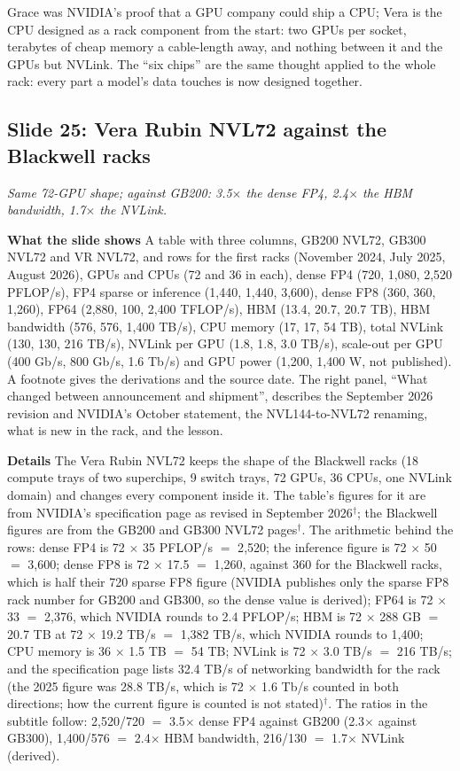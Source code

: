\documentclass[11pt,letterpaper]{article}
\newcommand{\slide}[3]{%
  \subsection[Slide #1: #2]{Slide #1: #2}%
  {\color{muted}\itshape #3\par}\medskip}
\newcommand{\para}[1]{\medskip\noindent\textbf{#1}\quad}
\newenvironment{intuition}{\begin{tcolorbox}[intuitionbox]}{\end{tcolorbox}}
\begin{document}
\begin{intuition}
Grace was NVIDIA's proof that a GPU company could ship a CPU; Vera is the CPU designed as a rack component from the start: two GPUs per socket, terabytes of cheap memory a cable-length away, and nothing between it and the GPUs but NVLink. The ``six chips'' are the same thought applied to the whole rack: every part a model's data touches is now designed together.
\end{intuition}


\slide{25}{Vera Rubin NVL72 against the Blackwell racks}{Same 72-GPU shape; against GB200: 3.5$\times$ the dense FP4, 2.4$\times$ the HBM bandwidth, 1.7$\times$ the NVLink.}

\para{What the slide shows} A table with three columns, GB200 NVL72, GB300 NVL72 and VR NVL72, and rows for the first racks (November 2024, July 2025, August 2026), GPUs and CPUs (72 and 36 in each), dense FP4 (720, 1{,}080, 2{,}520 PFLOP/s), FP4 sparse or inference (1{,}440, 1{,}440, 3{,}600), dense FP8 (360, 360, 1{,}260), FP64 (2{,}880, 100, 2{,}400 TFLOP/s), HBM (13.4, 20.7, 20.7 TB), HBM bandwidth (576, 576, 1{,}400 TB/s), CPU memory (17, 17, 54 TB), total NVLink (130, 130, 216 TB/s), NVLink per GPU (1.8, 1.8, 3.0 TB/s), scale-out per GPU (400 Gb/s, 800 Gb/s, 1.6 Tb/s) and GPU power (1{,}200, 1{,}400 W, not published). A footnote gives the derivations and the source date. The right panel, ``What changed between announcement and shipment'', describes the September 2026 revision and NVIDIA's October statement, the NVL144-to-NVL72 renaming, what is new in the rack, and the lesson.

\para{Details} The Vera Rubin NVL72 keeps the shape of the Blackwell racks (18 compute trays of two superchips, 9 switch trays, 72 GPUs, 36 CPUs, one NVLink domain) and changes every component inside it. The table's figures for it are from NVIDIA's specification page as revised in September 2026$^\dagger$; the Blackwell figures are from the GB200 and GB300 NVL72 pages$^\dagger$. The arithmetic behind the rows: dense FP4 is 72 $\times$ 35 PFLOP/s $=$ 2{,}520; the inference figure is 72 $\times$ 50 $=$ 3{,}600; dense FP8 is 72 $\times$ 17.5 $=$ 1{,}260, against 360 for the Blackwell racks, which is half their 720 sparse FP8 figure (NVIDIA publishes only the sparse FP8 rack number for GB200 and GB300, so the dense value is derived); FP64 is 72 $\times$ 33 $=$ 2{,}376, which NVIDIA rounds to 2.4 PFLOP/s; HBM is 72 $\times$ 288 GB $=$ 20.7 TB at 72 $\times$ 19.2 TB/s $=$ 1{,}382 TB/s, which NVIDIA rounds to 1{,}400; CPU memory is 36 $\times$ 1.5 TB $=$ 54 TB; NVLink is 72 $\times$ 3.0 TB/s $=$ 216 TB/s; and the specification page lists 32.4 TB/s of networking bandwidth for the rack (the 2025 figure was 28.8 TB/s, which is 72 $\times$ 1.6 Tb/s counted in both directions; how the current figure is counted is not stated)$^\dagger$. The ratios in the subtitle follow: 2{,}520/720 $=$ 3.5$\times$ dense FP4 against GB200 (2.3$\times$ against GB300), 1{,}400/576 $=$ 2.4$\times$ HBM bandwidth, 216/130 $=$ 1.7$\times$ NVLink (derived).
\end{document}

